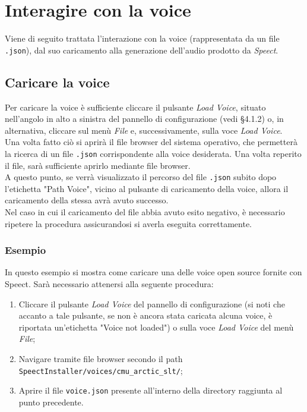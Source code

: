 \documentclass[openany,12pt,a4paper]{report}
\begin{document}
	\section{Interagire con la voice}
	Viene di seguito trattata l'interazione con la voice (rappresentata da un file \verb|.json|), dal suo caricamento alla generazione dell'audio prodotto da \textit{Speect}.
	
	\subsection{Caricare la voice}
	Per caricare la voice è sufficiente cliccare il pulsante \textit{Load Voice}, situato nell'angolo in alto a sinistra del pannello di configurazione (vedi §4.1.2) o, in alternativa, cliccare sul menù \textit{File} e, successivamente, sulla voce \textit{Load Voice}.\\
	Una volta fatto ciò si aprirà il file browser del sistema operativo, che permetterà la ricerca di un file \verb|.json| corrispondente alla voice desiderata. Una volta reperito il file, sarà sufficiente aprirlo mediante file browser.\\
	A questo punto, se verrà visualizzato il percorso del file \verb|.json| subito dopo l'etichetta "Path Voice", vicino al pulsante di caricamento della voice, allora il caricamento della stessa avrà avuto successo.\\
	Nel caso in cui il caricamento del file abbia avuto esito negativo, è necessario ripetere la procedura assicurandosi si averla eseguita correttamente.
	
	\subsubsection*{Esempio}
	
	In questo esempio si mostra come caricare una delle voice open source fornite con Speect. Sarà necessario attenersi alla seguente procedura:
	
	\begin{enumerate}
		\item Cliccare il pulsante \textit{Load Voice} del pannello di configurazione (si noti che accanto a tale pulsante, se non è ancora stata caricata alcuna voice, è riportata un'etichetta "Voice not loaded") o sulla voce \textit{Load Voice} del menù \textit{File};
		\item Navigare tramite file browser secondo il path \\ \verb|SpeectInstaller/voices/cmu_arctic_slt/|;
		\item Aprire il file \verb|voice.json| presente all'interno della directory raggiunta al punto precedente. 
	\end{enumerate} 
\end{document}
